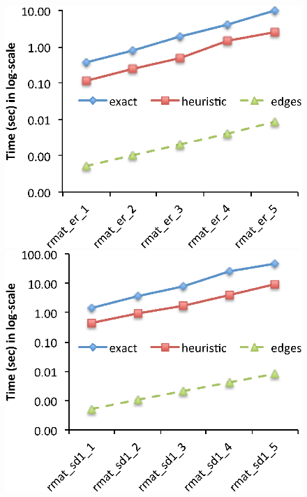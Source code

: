 \begin{figure}
  \centering
    \includegraphics[scale=0.6]{compare_time_er.eps}
    \includegraphics[scale=0.6]{compare_time_sd1.eps}
    

\end{figure}
